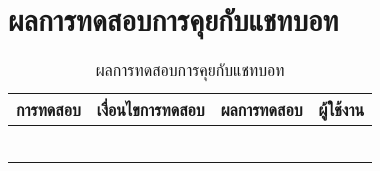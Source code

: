 \section{ผลการทดสอบการคุยกับแชทบอท}
\begin{table}[H]
	\caption{ผลการทดสอบการคุยกับแชทบอท}
    \centering	
	\label{tab:test9}
    \begin{tabular}{ | p{4cm} | p{4cm} | p{4cm} | p{2cm} | }
		\hline
	\multicolumn{1}{|c|}{การทดสอบ} & \multicolumn{1}{c|}{เงื่อนไขการทดสอบ} & \multicolumn{1}{c|}{ผลการทดสอบ} & \multicolumn{1}{c|}{ผู้ใช้งาน}                             \\ \hline
	\setstretch{1.0}{ทดสอบคุยกับแชทบอท}
	& \setstretch{1.0}{ผู้ใช้เข้ามาในหน้าแชทบอท}
	& \setstretch{1.0}{ระบบจะแสดงหน้าหน้าแชทบอท} 
	&\setstretch{1.0}{\begin{flushleft}ผู้ใช้งาน\end{flushleft}} \\ \cline{2-3} 
	& \setstretch{1.0}{ผู้ใช้ส่งข้อความโดยไม่ระบุข้อความ} 
	& \setstretch{1.0}{ระบบจะไม่ส่งข้อความไปยังแชทบอท} 
	&\setstretch{1.0}{}\\ \cline{2-3} 
	& \setstretch{1.0}{ผู้ใช้ส่งข้อความโดยระบุข้อความ} 
	& \setstretch{1.0}{ระบบจะส่งข้อความไปยังแชทบอท} 
	&\setstretch{1.0}{}\\ \cline{2-3} 
	& \setstretch{1.0}{ผู้ใช้กดเลือกปุ่มพิมพ์ด้วยเสียง และพูด} 
	& \setstretch{1.0}{ระบบจะแปลงเสียงเป็นข้อความแล้วส่งไปยังแชทบอท} 
	&\setstretch{1.0}{}\\ \cline{2-3} 
	& \setstretch{1.0}{ผู้ใช้กดเลือกปุ่มพิมพ์ด้วยเสียง และไม่พูด} 
	& \setstretch{1.0}{ระบบจะไม่ส่งข้อความไปยังแชทบอท} 
	&\setstretch{1.0}{}\\ \cline{2-3} 
	& \setstretch{1.0}{เมื่อผู้ใช้กดปุ่มฟังเสียงที่ข้อความ} 
	& \setstretch{1.0}{ระบบจะพูดตามข้อความที่แชทบอทได้ส่งกลับคืนมา} 
	&\setstretch{1.0}{}\\ \cline{2-3} 
    \end{tabular}
\end{table}

